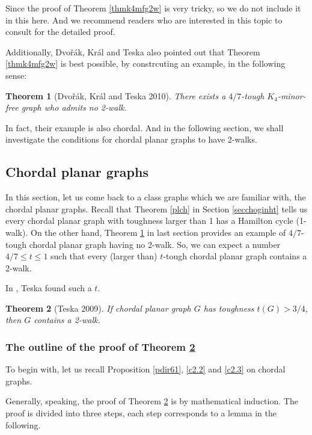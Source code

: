 \documentclass[12pt]{report}
\newtheorem{theorem}{Theorem}
\begin{document}
Since the proof of Theorem \ref{thmk4mfg2w} is very tricky, so we do not include it in this here. And we recommend readers who are interested in this topic to consult \cite{dvovrak2010toughness} for the detailed proof.

Additionally, Dvo{\v r}{\'a}k, Kr{\'a}l and Teska also pointed out that Theorem \ref{thmk4mfg2w} is best possible, by constrcuting an example, in the following sense:
\begin{theorem}[Dvo{\v r}{\'a}k, Kr{\'a}l and Teska 2010]\label{cedkt10thm2}
There exists a $4/7$-tough $K_4$-minor-free graph who admits no 2-walk.
\end{theorem}

In fact, their example is also chordal. And in the following section, we shall investigate the conditions for chordal planar graphs to have 2-walks.







\subsection{Chordal planar graphs}

In this section, let us come back to a class graphs which we are familiar with, the chordal planar graphs. Recall that Theorem \ref{plch} in Section \ref{secchoginht} tells us every chordal planar graph with toughness larger than 1 has a Hamilton cycle (1-walk). On the other hand, Theorem \ref{cedkt10thm2} in last section provides an example of $4/7$-tough chordal planar graph having no 2-walk. So, we can expect a number $4/7\le t\le1$ such that every (larger than) $t$-tough chordal planar graph contains a 2-walk.

In \cite{teska20092}, Teska found such a $t$.
\begin{theorem}[Teska 2009]\label{thm34t2w1}
If chordal planar graph $G$ has toughness $t(G)>3/4$, then $G$ contains a 2-walk.
\end{theorem}


\subsubsection{The outline of the proof of Theorem \ref{thm34t2w1}}
To begin with, let us recall Proposition \ref{pdir61}, \ref{c2.2} and \ref{c2.3} on chordal graphs.

Generally, speaking, the proof of Theorem \ref{thm34t2w1} is by mathematical induction. The proof is divided into three steps, each step corresponds to a lemma in the following.
\end{document}
